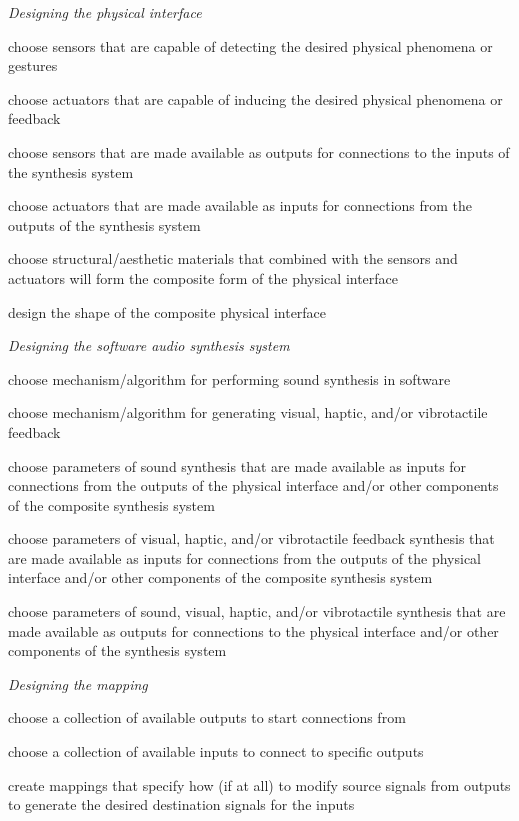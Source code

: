 \begin{description}
\item \emph{Designing the physical interface}
\begin{description}
\item choose sensors that are capable of detecting the desired physical phenomena or gestures
\item choose actuators that are capable of inducing the desired physical phenomena or feedback
\item choose sensors that are made available as outputs for connections to the inputs of the synthesis system
\item choose actuators that are made available as inputs for connections from the outputs of the synthesis system
\item choose structural/aesthetic materials that combined with the sensors and actuators will form the composite form of the physical interface
\item design the shape of the composite physical interface
\end{description}
\item \emph{Designing the software audio synthesis system}
\begin{description}
\item choose mechanism/algorithm for performing sound synthesis in software
\item choose mechanism/algorithm for generating visual, haptic, and/or vibrotactile feedback
\item choose parameters of sound synthesis that are made available as inputs for connections from the outputs of the physical interface and/or other components of the composite synthesis system
\item choose parameters of visual, haptic, and/or vibrotactile feedback synthesis that are made available as inputs for connections from the outputs of the physical interface and/or other components of the composite synthesis system
\item choose parameters of sound, visual, haptic, and/or vibrotactile synthesis that are made available as outputs for connections to the physical interface and/or other components of the synthesis system
\end{description}
\item \emph{Designing the mapping}
\begin{description}
	\item choose a collection of available outputs to start connections from
	\item choose a collection of available inputs to connect to specific outputs
	\item create mappings that specify how (if at all) to modify source signals from outputs to generate the desired destination signals for the inputs
\end{description}
\end{description}

